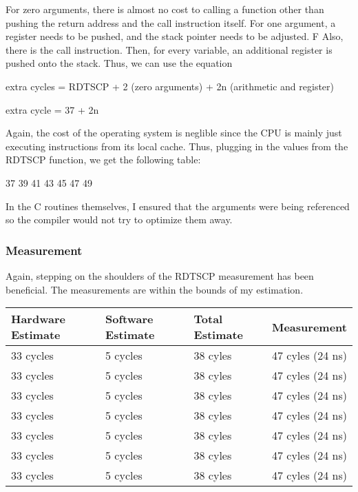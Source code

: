 \documentclass[paper=a4, fontsize=11pt]{scrartcl}
\numberwithin{equation}{section}		%
\numberwithin{figure}{section}			%
\numberwithin{table}{section}				%
\begin{document}
For zero arguments, there is almost no cost to calling a function other than pushing the return address and the call instruction itself.  For one argument, a register needs to be pushed, and the stack pointer needs to be adjusted.   F  Also, there is the call instruction. Then, for every variable, an additional register is pushed onto the stack.  Thus, we can use the equation

extra cycles = RDTSCP + 2 (zero arguments) + 2n (arithmetic and register) 

extra cycle = 37 + 2n

Again, the cost of the operating system is neglible since the CPU is mainly just executing instructions from its local cache.  Thus, plugging in the values from the RDTSCP function, we get the following table:

37
39
41
43
45
47
49

In the C routines themselves, I ensured that the arguments were being referenced so the compiler would not try to optimize them away.

\subsubsection{Measurement}

Again, stepping on the shoulders of the RDTSCP measurement has been beneficial.  The measurements are within the bounds of my estimation.

\begin{center}
    \begin{tabular}{ | l | l | l | p{5cm} |}
    \hline
    Hardware Estimate & Software Estimate & Total Estimate & Measurement \\ \hline
    33 cycles & 5 cycles & 38 cyles & 47 cyles (24 ns) \\ \hline
    33 cycles & 5 cycles & 38 cyles & 47 cyles (24 ns) \\  \hline
    33 cycles & 5 cycles & 38 cyles & 47 cyles (24 ns) \\  \hline
    33 cycles & 5 cycles & 38 cyles & 47 cyles (24 ns) \\  \hline
    33 cycles & 5 cycles & 38 cyles & 47 cyles (24 ns) \\  \hline
    33 cycles & 5 cycles & 38 cyles & 47 cyles (24 ns) \\  \hline
    33 cycles & 5 cycles & 38 cyles & 47 cyles (24 ns) \\ 
    \hline
    \end{tabular}
\end{center}
\end{document}
